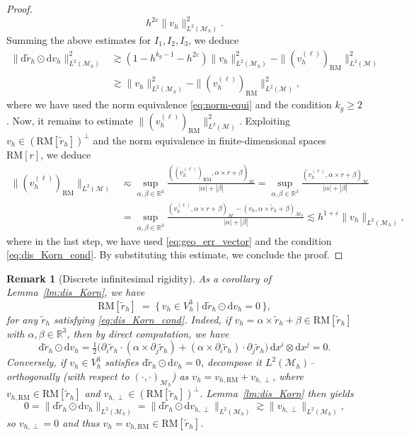 \documentclass[11pt,a4paper,oneside,reqno]{amsart}
\theoremstyle{definition}
\theoremstyle{plain}
\newtheorem{remark}{Remark}[section]
\numberwithin{theorem}{section}
\numberwithin{proposition}{section}
\numberwithin{lemma}{section}
\numberwithin{equation}{section}
\newcommand{\Man}{\mathcal{M}}
\newcommand{\RM}{\mathrm{RM}}
\begin{document}
\begin{proof}
\[    h^{2\varepsilon} \| v_h\|_{L^2(\Man_h)}^2 .
    \]
    Summing the above estimates for $I_1, I_2, I_3$, we deduce 
    \[ \begin{aligned}
        \| \mathrm{d} \tilde r_h \odot \mathrm{d} v_h \|_{L^2(\Man_h)}^2 &\gtrsim
        (1 - h^{k_g-1} - h^{2\varepsilon})\|v_h\|_{L^2(\Man_h)}^2 -  \| (v_h^{(\ell)})_{\RM}\|_{L^2(\Man)}^2\\ 
        &\gtrsim \|v_h\|_{L^2(\Man_h)}^2 -  \| (v_h^{(\ell)})_{\RM}\|_{L^2(\Man)}^2,
    \end{aligned} \]
    where we have used the norm equivalence \eqref{eq:norm-equi} and the condition $k_g \geq 2$. 
    Now, it remains to estimate $\| (v_h^{(\ell)})_{\RM}\|_{L^2(\Man)}^2$.
    Exploiting $v_h \in (\RM[\tilde r_h])^\perp$ 
    and the norm equivalence in finite-dimensional spaces $\RM[r]$, we deduce 
    \[ \begin{aligned}
       \| (v_h^{(\ell)})_{\RM}\|_{L^2(\Man)} & \eqsim 
       \sup_{\alpha, \beta \in \mathbb{R}^3} 
       \frac{((v_h^{(\ell)})_{\RM}, 
       \alpha \times r + \beta)_{\Man}}{|\alpha| + |\beta|} 
       = \sup_{\alpha, \beta \in \mathbb{R}^3} 
       \frac{(v_h^{(\ell)}, 
       \alpha \times r + \beta)_{\Man} }{|\alpha| + |\beta|}  \\ 
       & = \sup_{\alpha, \beta \in \mathbb{R}^3} 
       \frac{(v_h^{(\ell)}, 
       \alpha \times r + \beta)_{\Man} 
       - (v_h, \alpha \times \tilde r_h + \beta)_{\Man_h} 
       }{|\alpha| + |\beta|} \lesssim h^{1+\varepsilon} \|v_h\|_{L^2(\Man_h)},
    \end{aligned} \] 
where in the last step, we have used \eqref{eq:geo_err_vector} and the condition \eqref{eq:dis_Korn_cond}.    
By substituting this estimate, we conclude the proof.
\end{proof}
\begin{remark}[Discrete infinitesimal rigidity]\label{rmk:rigid}
\upshape
As a corollary of Lemma~\ref{lm:dis_Korn}, we have
\begin{equation}\label{eq:dis-rigidity}
\RM[\tilde r_h] \;=\; \{\, v_h \in V_h^3 \mid \mathrm{d}\tilde r_h \odot \mathrm{d}v_h = 0 \,\},
\end{equation}
for any $\tilde r_h$ satisfying \eqref{eq:dis_Korn_cond}. Indeed, if $v_h=\alpha\times \tilde r_h+\beta\in \RM[\tilde r_h]$ with $\alpha,\beta\in\mathbb{R}^3$, then by direct computation, we have
\[
\mathrm{d}\tilde r_h \odot \mathrm{d}v_h
= \tfrac12(\partial_i\tilde r_h\cdot(\alpha\times \partial_j\tilde r_h)
+ (\alpha\times \partial_i\tilde r_h)\cdot \partial_j\tilde r_h\big)\,\mathrm{d}x^i\otimes \mathrm{d}x^j
=0.
\]
Conversely, if $v_h\in V_h^3$ satisfies $\mathrm{d}\tilde r_h\odot \mathrm{d}v_h=0$, decompose it $L^2(\Man_h)$–orthogonally (with respect to $(\cdot,\cdot)_{\Man_h}$) as $v_h=v_{h,\mathrm{RM}}+v_{h,\perp}$, where $v_{h,\mathrm{RM}}\in \RM[\tilde r_h]$ and $v_{h,\perp}\in (\RM[\tilde r_h])^\perp$. Lemma~\ref{lm:dis_Korn} then yields
\[
0=\|\mathrm{d}\tilde r_h\odot \mathrm{d}v_h\|_{L^2(\Man_h)}
=\|\mathrm{d}\tilde r_h\odot \mathrm{d}v_{h,\perp}\|_{L^2(\Man_h)} \gtrsim \|v_{h,\perp}\|_{L^2(\Man_h)},
\]
so $v_{h,\perp}=0$ and thus $v_h=v_{h,\mathrm{RM}}\in \RM[\tilde r_h]$.
\end{remark}
\end{document}
